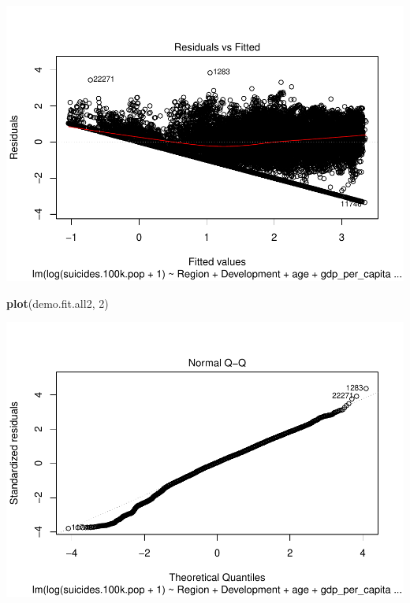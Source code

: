 \documentclass[11pt,]{article}
\newenvironment{Shaded}{\begin{snugshade}}{\end{snugshade}}
\newcommand{\DecValTok}[1]{\textcolor[rgb]{0.00,0.00,0.81}{#1}}
\newcommand{\KeywordTok}[1]{\textcolor[rgb]{0.13,0.29,0.53}{\textbf{#1}}}
\newcommand{\NormalTok}[1]{#1}
\begin{document}
\includegraphics{An-Analysis-of-Suicide-Data_files/figure-latex/unnamed-chunk-2-3.pdf}

\begin{Shaded}
\begin{Highlighting}[]
\KeywordTok{plot}\NormalTok{(demo.fit.all2, }\DecValTok{2}\NormalTok{)}
\end{Highlighting}
\end{Shaded}

\includegraphics{An-Analysis-of-Suicide-Data_files/figure-latex/unnamed-chunk-2-4.pdf}
\end{document}
